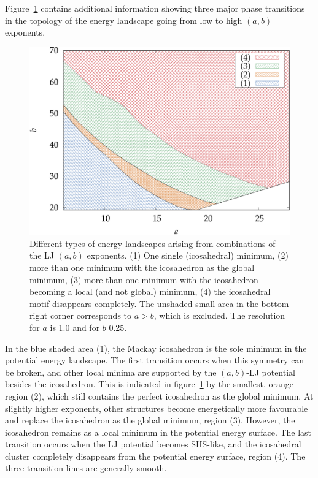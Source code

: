 Figure~\ref{fig:no-ico} contains additional information showing three major
phase transitions in the topology of the energy landscape going from low to high
$(a,b)$ exponents. 
%
\begin{figure}[htb]\centering
    \includegraphics[width=.8\columnwidth]{gregory-newton/no-ico.pdf}
    \caption{Different types of energy landscapes arising from combinations of
    the LJ $(a,b)$ exponents. (1) One single (icosahedral) minimum, (2) more
    than one minimum with the icosahedron as the global minimum, (3) more than
    one minimum with the icosahedron becoming a local (and not global) minimum,
    (4) the icosahedral motif disappears completely. The unshaded small area
    in the bottom right corner corresponds to $a>b$, which is excluded. The
    resolution for $a$ is 1.0 and for $b$ 0.25.}
    \label{fig:no-ico}
\end{figure}
%
In the blue shaded area (1), the Mackay icosahedron is the sole minimum in the
potential energy landscape. The first transition occurs when this symmetry can
be broken, and other local minima are supported by the $(a,b)$-\ac{LJ} potential
besides the icosahedron. This is indicated in figure~\ref{fig:no-ico} by the
smallest, orange region (2), which still contains the perfect icosahedron as the
global minimum. At slightly higher exponents, other structures become
energetically more favourable and replace the icosahedron as the global minimum,
region (3). However, the icosahedron remains as a local minimum in the potential
energy surface. The last transition occurs when the LJ potential becomes
SHS-like, and the icosahedral cluster completely disappears from the potential
energy surface, region (4). The three transition lines are generally smooth.

